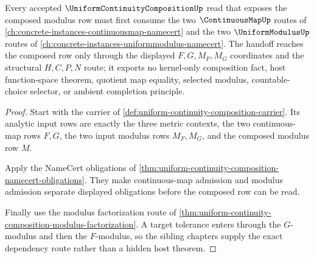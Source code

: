 \begin{theorem}
\label{thm:uniform-continuity-composition-sibling-dependency-route}
Every accepted $\UniformContinuityCompositionUp$ read that exposes the composed modulus row must first consume the two $\ContinuousMapUp$ routes of \autoref{ch:concrete-instances-continuousmap-namecert} and the two $\UniformModulusUp$ routes of \autoref{ch:concrete-instances-uniformmodulus-namecert}. The handoff reaches the composed row only through the displayed $F,G,M_F,M_G$ coordinates and the structural $H,C,P,N$ route; it exports no kernel-only composition fact, host function-space theorem, quotient map equality, selected modulus, countable-choice selector, or ambient completion principle.
\end{theorem}
\begin{proof}
Start with the carrier of \autoref{def:uniform-continuity-composition-carrier}. Its analytic input rows are exactly the three metric contexts, the two continuous-map rows $F,G$, the two input modulus rows $M_F,M_G$, and the composed modulus row $M$.

Apply the NameCert obligations of \autoref{thm:uniform-continuity-composition-namecert-obligations}. They make continuous-map admission and modulus admission separate displayed obligations before the composed row can be read.

Finally use the modulus factorization route of \autoref{thm:uniform-continuity-composition-modulus-factorization}. A target tolerance enters through the $G$-modulus and then the $F$-modulus, so the sibling chapters supply the exact dependency route rather than a hidden host theorem.
\end{proof}
